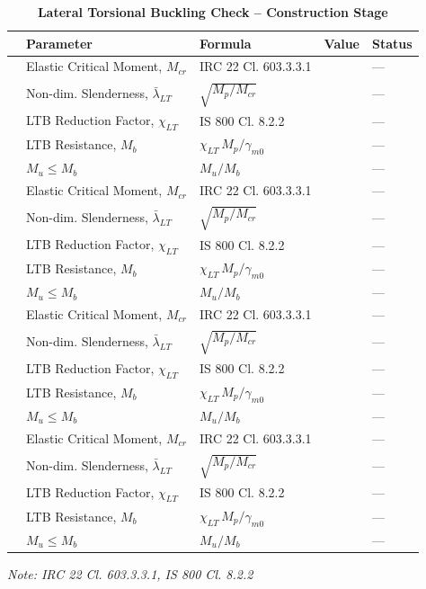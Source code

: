 \documentclass[12pt,a4paper]{report}
\numberwithin{table}{chapter}
\numberwithin{figure}{chapter}
\begin{document}
\vspace{1em}
\begin{longtable}{|C{2.5cm}|C{3.5cm}|C{3.5cm}|>{\centering\arraybackslash}p{4.2cm}|C{1.8cm}|}
\caption{\textbf{Lateral Torsional Buckling Check -- Construction Stage}}\\
\hline
\textbf{} & \textbf{Parameter} & \textbf{Formula} & \textbf{Value} & \textbf{Status} \\[6pt]
\hline
{} & Elastic Critical Moment, $M_{cr}$ & IRC 22 Cl. 603.3.3.1 &  & --- \\[6pt]
 & Non-dim. Slenderness, $\bar{\lambda}_{LT}$ & $\sqrt{M_p / M_{cr}}$ &  & --- \\[6pt]
 & LTB Reduction Factor, $\chi_{LT}$ & IS 800 Cl. 8.2.2 &  & --- \\[6pt]
 & LTB Resistance, $M_b$ & $\chi_{LT}\,M_p / \gamma_{m0}$ &  & --- \\[6pt]
 & $M_u \leq M_b$ & $M_u / M_b$ &  & --- \\[6pt]
\hline
{} & Elastic Critical Moment, $M_{cr}$ & IRC 22 Cl. 603.3.3.1 &  & --- \\[6pt]
 & Non-dim. Slenderness, $\bar{\lambda}_{LT}$ & $\sqrt{M_p / M_{cr}}$ &  & --- \\[6pt]
 & LTB Reduction Factor, $\chi_{LT}$ & IS 800 Cl. 8.2.2 &  & --- \\[6pt]
 & LTB Resistance, $M_b$ & $\chi_{LT}\,M_p / \gamma_{m0}$ &  & --- \\[6pt]
 & $M_u \leq M_b$ & $M_u / M_b$ &  & --- \\[6pt]
\hline
{} & Elastic Critical Moment, $M_{cr}$ & IRC 22 Cl. 603.3.3.1 &  & --- \\[6pt]
 & Non-dim. Slenderness, $\bar{\lambda}_{LT}$ & $\sqrt{M_p / M_{cr}}$ &  & --- \\[6pt]
 & LTB Reduction Factor, $\chi_{LT}$ & IS 800 Cl. 8.2.2 &  & --- \\[6pt]
 & LTB Resistance, $M_b$ & $\chi_{LT}\,M_p / \gamma_{m0}$ &  & --- \\[6pt]
 & $M_u \leq M_b$ & $M_u / M_b$ &  & --- \\[6pt]
\hline
{} & Elastic Critical Moment, $M_{cr}$ & IRC 22 Cl. 603.3.3.1 &  & --- \\[6pt]
 & Non-dim. Slenderness, $\bar{\lambda}_{LT}$ & $\sqrt{M_p / M_{cr}}$ &  & --- \\[6pt]
 & LTB Reduction Factor, $\chi_{LT}$ & IS 800 Cl. 8.2.2 &  & --- \\[6pt]
 & LTB Resistance, $M_b$ & $\chi_{LT}\,M_p / \gamma_{m0}$ &  & --- \\[6pt]
 & $M_u \leq M_b$ & $M_u / M_b$ &  & --- \\[6pt]
\hline
\end{longtable}
\noindent\textit{Note: IRC 22 Cl. 603.3.3.1, IS 800 Cl. 8.2.2}
\end{document}
